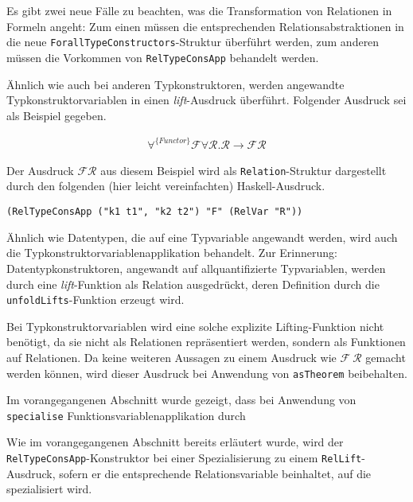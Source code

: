 Es gibt zwei neue Fälle zu beachten, was die Transformation von Relationen in Formeln angeht: Zum einen müssen die
entsprechenden Relationsabstraktionen in die neue \texttt{ForallTypeConstructors}-Struktur überführt werden, zum anderen
müssen die Vorkommen von \texttt{RelTypeConsApp} behandelt werden.

Ähnlich wie auch bei anderen Typkonstruktoren, werden angewandte Typkonstruktorvariablen in einen \textit{lift}-Ausdruck
überführt. Folgender Ausdruck sei als Beispiel gegeben.

\begin{align*}
\forall^{\{Functor\}} \mathcal{F} \forall \mathcal{R} . \mathcal{R} \rightarrow \mathcal{F} \mathcal{R}
\end{align*}

Der Ausdruck $\mathcal{F} \mathcal{R}$ aus diesem Beispiel wird als \texttt{Relation}-Struktur dargestellt durch den folgenden
(hier leicht vereinfachten) Haskell-Ausdruck.

\begin{verbatim}
(RelTypeConsApp ("k1 t1", "k2 t2") "F" (RelVar "R"))
\end{verbatim}


Ähnlich wie Datentypen, die auf eine Typvariable angewandt werden, wird auch die Typkonstruktorvariablenapplikation
behandelt. Zur Erinnerung: Datentypkonstruktoren, angewandt auf allquantifizierte Typvariablen, werden durch eine
\textit{lift}-Funktion als Relation ausgedrückt, deren Definition durch die \texttt{unfoldLifts}-Funktion erzeugt wird.

Bei Typkonstruktorvariablen wird eine solche explizite Lifting-Funktion nicht benötigt, da sie nicht als Relationen repräsentiert
werden, sondern als Funktionen auf Relationen. Da keine weiteren Aussagen zu einem Ausdruck wie $\mathcal{F}\ \mathcal{R}$
gemacht werden können, wird dieser Ausdruck bei Anwendung von \texttt{asTheorem} beibehalten.

Im vorangegangenen Abschnitt wurde gezeigt, dass bei Anwendung von \texttt{specialise} Funktionsvariablenapplikation
durch 

Wie im vorangegangenen Abschnitt bereits erläutert wurde, wird der \texttt{RelTypeConsApp}-Konstruktor bei einer Spezialisierung
zu einem \texttt{RelLift}-Ausdruck, sofern er die entsprechende Relationsvariable beinhaltet, auf die spezialisiert wird.

